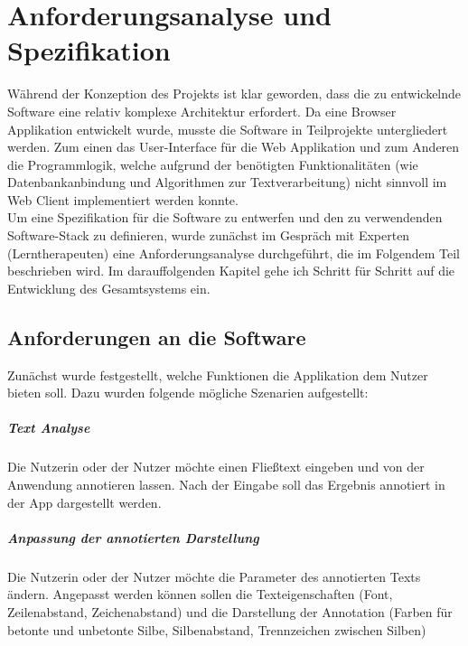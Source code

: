 
\chapter{Anforderungsanalyse und Spezifikation}

Während der Konzeption des Projekts ist klar geworden, dass die zu entwickelnde Software eine relativ komplexe Architektur erfordert. Da eine Browser Applikation entwickelt wurde, musste die Software in Teilprojekte untergliedert werden. Zum einen das User-Interface für die Web Applikation und zum Anderen die Programmlogik, welche aufgrund der benötigten Funktionalitäten (wie Datenbankanbindung und Algorithmen zur Textverarbeitung) nicht sinnvoll im Web Client implementiert werden konnte.\\
Um eine Spezifikation für die Software zu entwerfen und den zu verwendenden Software-Stack zu definieren, wurde zunächst im Gespräch mit Experten (Lerntherapeuten) eine Anforderungsanalyse durchgeführt, die im Folgendem Teil beschrieben wird. Im darauffolgenden Kapitel gehe ich Schritt für Schritt auf die Entwicklung des Gesamtsystems ein.

\section{Anforderungen an die Software}

Zunächst wurde festgestellt, welche Funktionen die Applikation dem Nutzer bieten soll. Dazu wurden folgende mögliche Szenarien aufgestellt:

\paragraph{Text Analyse} 
Die Nutzerin oder der Nutzer möchte einen Fließtext eingeben und von der Anwendung annotieren lassen. Nach der Eingabe soll das Ergebnis annotiert in der App dargestellt werden.

\paragraph{Anpassung der annotierten Darstellung}
Die Nutzerin oder der Nutzer möchte die Parameter des annotierten Texts ändern. Angepasst werden können sollen die Texteigenschaften (Font, Zeilenabstand, Zeichenabstand) und die Darstellung der Annotation (Farben für betonte und unbetonte Silbe, Silbenabstand, Trennzeichen zwischen Silben)

